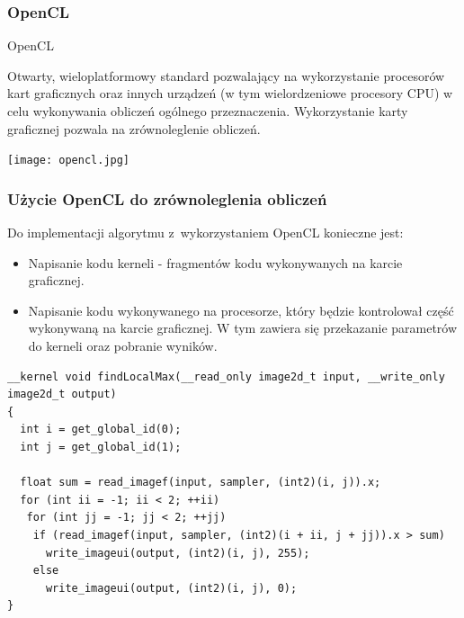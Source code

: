 \begin{frame}
	\frametitle{OpenCL}
	\begin{block}{OpenCL}
	\begin{tiny}
		Otwarty, wieloplatformowy standard pozwalający na wykorzystanie procesorów kart graficznych oraz innych urządzeń (w tym wielordzeniowe procesory CPU) w celu wykonywania obliczeń ogólnego przeznaczenia. Wykorzystanie karty graficznej pozwala na zrównoleglenie obliczeń.
	\end{tiny}
	\end{block}
	\begin{center}
	\texttt{[image: opencl.jpg]}
	\end{center}
\end{frame}


\begin{frame}[fragile]
	\frametitle{Użycie OpenCL do zrównoleglenia obliczeń}
	\begin{tiny}
	Do implementacji algorytmu z~wykorzystaniem OpenCL konieczne jest:
	\begin{itemize}
		\item Napisanie kodu kerneli - fragmentów kodu wykonywanych na karcie graficznej.
		\item Napisanie kodu wykonywanego na procesorze, który będzie kontrolował część wykonywaną na karcie graficznej. W tym zawiera się przekazanie parametrów do kerneli oraz pobranie wyników.
	\end{itemize}
	\end{tiny}

	\lstset{language=C,label=lis:edgeDetector,breaklines=true,basicstyle=\tiny\ttfamily}
	\begin{lstlisting}
__kernel void findLocalMax(__read_only image2d_t input, __write_only image2d_t output)
{
  int i = get_global_id(0);
  int j = get_global_id(1);

  float sum = read_imagef(input, sampler, (int2)(i, j)).x;
  for (int ii = -1; ii < 2; ++ii)
   for (int jj = -1; jj < 2; ++jj)
    if (read_imagef(input, sampler, (int2)(i + ii, j + jj)).x > sum)
      write_imageui(output, (int2)(i, j), 255);
    else
      write_imageui(output, (int2)(i, j), 0);
}
\end{lstlisting}



\end{frame}


